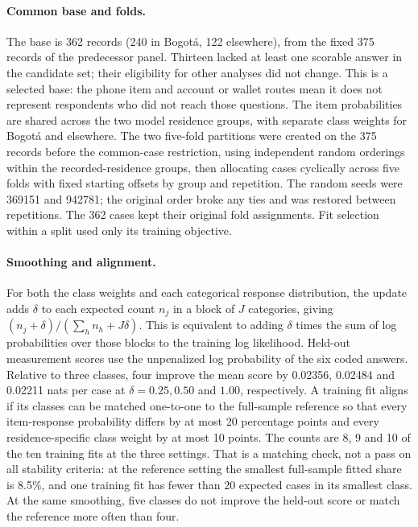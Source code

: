 \paragraph{Common base and folds.}
The base is 362 records (240 in Bogotá, 122 elsewhere), from the fixed 375 records of the predecessor panel. Thirteen lacked at least one scorable answer in the candidate set; their eligibility for other analyses did not change. This is a selected base: the phone item and account or wallet routes mean it does not represent respondents who did not reach those questions. The item probabilities are shared across the two model residence groups, with separate class weights for Bogotá and elsewhere. The two five-fold partitions were created on the 375 records before the common-case restriction, using independent random orderings within the recorded-residence groups, then allocating cases cyclically across five folds with fixed starting offsets by group and repetition. The random seeds were 369151 and 942781; the original order broke any ties and was restored between repetitions. The 362 cases kept their original fold assignments. Fit selection within a split used only its training objective.

\paragraph{Smoothing and alignment.}
For both the class weights and each categorical response distribution, the update adds $\delta$ to each expected count $n_j$ in a block of $J$ categories, giving $(n_j+\delta)/(\sum_h n_h+J\delta)$. This is equivalent to adding $\delta$ times the sum of log probabilities over those blocks to the training log likelihood. Held-out measurement scores use the unpenalized log probability of the six coded answers. Relative to three classes, four improve the mean score by 0.02356, 0.02484 and 0.02211 nats per case at $\delta=0.25, 0.50$ and $1.00$, respectively. A training fit aligns if its classes can be matched one-to-one to the full-sample reference so that every item-response probability differs by at most 20 percentage points and every residence-specific class weight by at most 10 points. The counts are 8, 9 and 10 of the ten training fits at the three settings. That is a matching check, not a pass on all stability criteria: at the reference setting the smallest full-sample fitted share is 8.5\%, and one training fit has fewer than 20 expected cases in its smallest class. At the same smoothing, five classes do not improve the held-out score or match the reference more often than four.

